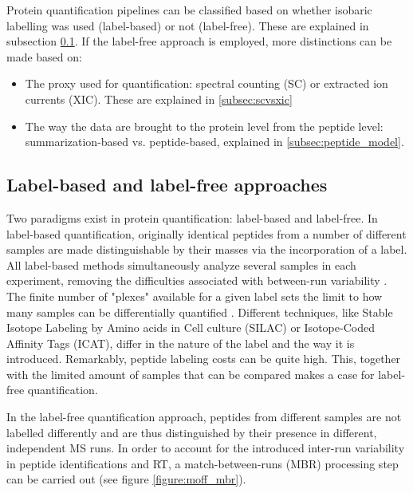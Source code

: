 \documentclass[thesis]{subfiles}
\begin{document}
Protein quantification pipelines can be classified based on whether isobaric labelling was used (label-based) or not (label-free). These are explained in subsection \ref{subsec:labelling}. If the label-free approach is employed, more distinctions can be made based on:

\begin{itemize}
\item The proxy used for quantification: spectral counting (\ac{SC}) or extracted ion currents (\ac{XIC}). These are explained in \ref{subsec:scvsxic}


\item The way the data are brought to the protein level from the peptide level: summarization-based vs. peptide-based, explained in \ref{subsec:peptide_model}.
\end{itemize}

\subsection{Label-based and label-free approaches}
\label{subsec:labelling}


Two paradigms exist in protein quantification: label-based and label-free. In label-based quantification, originally identical peptides from a number of different samples are made distinguishable by their masses via the incorporation of a label. All label-based methods simultaneously analyze several samples in each experiment, removing the difficulties associated with between-run variability \cite{Barsnes2008}. The finite number of "plexes" available for a given label sets the limit to how many samples can be differentially quantified \cite{Cox2014}. Different techniques, like Stable Isotope Labeling by Amino acids in Cell culture (SILAC) or Isotope-Coded Affinity Tags (ICAT), differ in the nature of the label and the way it is introduced. Remarkably, peptide labeling costs can be quite high. This, together with the limited amount of samples that can be compared makes a case for label-free quantification.

In the label-free quantification approach, peptides from different samples are not labelled differently and are thus distinguished by their presence in different, independent \ac{MS} runs. In order to account for the introduced inter-run variability in peptide identifications and \ac{RT}, a match-between-runs (MBR) processing step can be carried out (see figure \ref{figure:moff_mbr}). 
\end{document}

